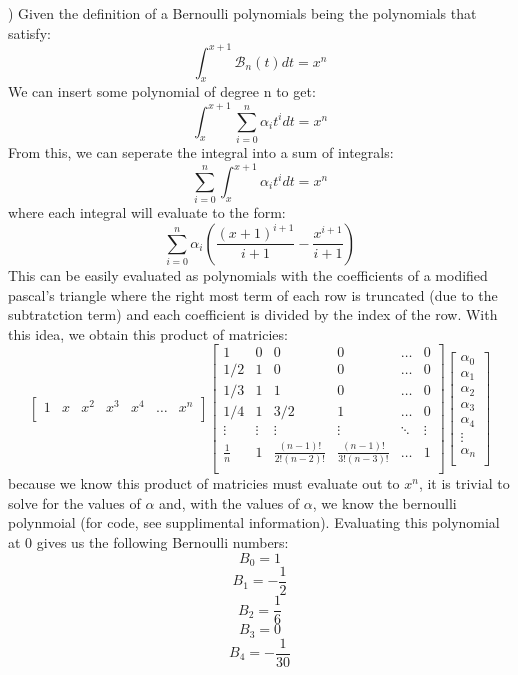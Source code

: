 \documentclass{article}
\begin{document}
) Given the definition of a Bernoulli polynomials being the polynomials that satisfy:
	$$\int_{x}^{x+1} \mathcal{B}_n(t)dt = x^n$$
We can insert some polynomial of degree n to get:
        $$\int_{x}^{x+1} \sum_{i=0}^{n}\alpha_i t^idt = x^n$$
From this, we can seperate the integral into a sum of integrals:
	$$\sum_{i=0}^{n}\int_{x}^{x+1} \alpha_i t^idt = x^n$$
where each integral will evaluate to the form:
	$$\sum_{i=0}^{n}\alpha_i\left(\frac{(x+1)^{i+1}}{i+1} - \frac{x^{i+1}}{i+1}\right)$$
This can be easily evaluated as polynomials with the coefficients of a modified pascal's triangle where the right most term of each row is truncated (due to the subtratction term) and each coefficient is divided by the index of the row. With this idea, we obtain this product of matricies:
\[
\begin{bmatrix}
	1 & x & x^2 & x^3 & x^4 & \dots & x^n \\
\end{bmatrix}
\begin{bmatrix}
	1 & 0 & 0 & 0 & \dots & 0 \\
	1/2 & 1 & 0 & 0 & \dots & 0 \\
	1/3 & 1 & 1 & 0 & \dots & 0 \\
	1/4 & 1 & 3/2 & 1 & \dots & 0 \\
	\vdots & \vdots & \vdots & \vdots & \ddots & \vdots \\
	\frac{1}{n} & 1 & \frac{(n-1)!}{2!(n-2)!} & \frac{(n-1)!}{3!(n-3)!} & \dots & 1 \\
\end{bmatrix}
\begin{bmatrix}
	\alpha_0 \\ \alpha_1 \\ \alpha_2 \\ \alpha_3 \\ \alpha_4 \\ \vdots \\ \alpha_n \\
\end{bmatrix}
\]
because we know this product of matricies must evaluate out to $x^n$, it is trivial to solve for the values of $\alpha$ and, with the values of $\alpha$, we know the bernoulli polynmoial (for code, see supplimental information). Evaluating this polynomial at 0 gives us the following Bernoulli numbers:
	$$B_0 = 1$$
	$$B_1 = -\frac{1}{2}$$
	$$B_2 = \frac{1}{6}$$
	$$B_3 = 0$$
	$$B_4 = -\frac{1}{30}$$
\end{document}
